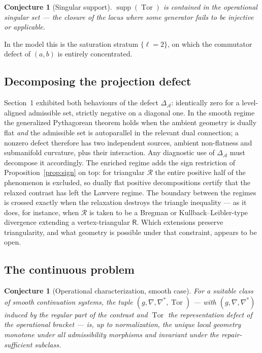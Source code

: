 \documentclass[11pt]{article}
\newtheorem{conjecture}[theorem]{Conjecture}
\theoremstyle{remark}
\newcommand{\A}{\mathcal{A}}
\newcommand{\R}{\mathsf{R}}
\newcommand{\Tor}{\operatorname{Tor}}
\begin{document}
\begin{conjecture}[Singular support]\label{conj:support}
$\operatorname{supp}(\Tor)$ is contained in the operational singular
set --- the closure of the locus where some generator fails to be
injective or applicable.
\end{conjecture}

In the model this is the saturation stratum $\{\ell=2\}$, on which the
commutator defect of $(a,b)$ is entirely concentrated.

\subsection{Decomposing the projection defect}

Section~1 exhibited both behaviours of the defect $\Delta_{\A}$:
identically zero for a level-aligned admissible set, strictly negative
on a diagonal one. In the smooth regime the generalized Pythagorean
theorem holds when the ambient geometry is dually flat \emph{and} the
admissible set is autoparallel in the relevant dual connection; a
nonzero defect therefore has two independent sources, ambient
non-flatness and submanifold curvature, plus their interaction. Any
diagnostic use of $\Delta_{\A}$ must decompose it accordingly. The
enriched regime adds the sign restriction of
Proposition~\ref{prop:sign} on top: for triangular $\mathcal{R}$ the
entire positive half of the phenomenon is excluded, so dually flat
positive decompositions certify that the relaxed contrast has left the
Lawvere regime. The boundary between the regimes is crossed exactly
when the relaxation destroys the triangle inequality --- as it does,
for instance, when $\mathcal{R}$ is taken to be a Bregman or
Kullback--Leibler-type divergence extending a vertex-triangular $\R$.
Which extensions preserve triangularity, and what geometry is possible
under that constraint, appears to be open.

\subsection{The continuous problem}

\begin{conjecture}[Operational characterization, smooth case]
For a suitable class of smooth continuation systems, the tuple
$(g,\nabla,\nabla^{*},\Tor)$ --- with $(g,\nabla,\nabla^{*})$ induced
by the regular part of the contrast and $\Tor$ the representation
defect of the operational bracket --- is, up to normalization, the
unique local geometry monotone under all admissibility morphisms and
invariant under the repair-sufficient subclass.
\end{conjecture}
\end{document}
